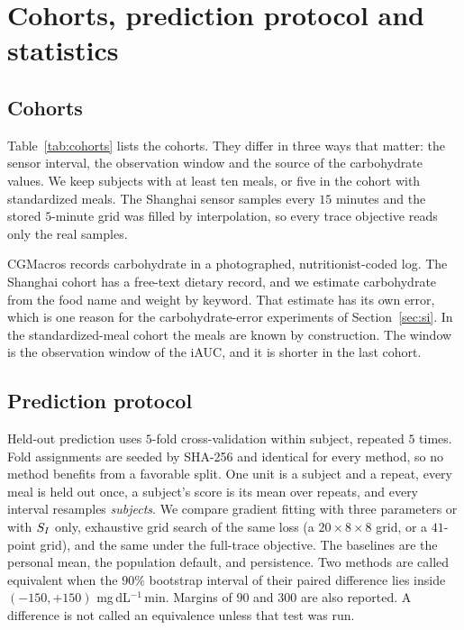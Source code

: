 \section{Cohorts, prediction protocol and statistics}
\label{app:setting}

\subsection{Cohorts}
\label{sec:cohorts}

Table~\ref{tab:cohorts} lists the cohorts. They differ in three ways that matter: the sensor interval, the observation
window and the source of the carbohydrate values. We keep subjects with at least ten meals, or five in the cohort with
standardized meals. The Shanghai sensor samples every $15$ minutes and the stored $5$-minute grid was filled by
interpolation, so every trace objective reads only the real samples.



CGMacros records carbohydrate in a photographed, nutritionist-coded log. The Shanghai cohort has a free-text dietary
record, and we estimate carbohydrate from the food name and weight by keyword. That estimate has its own error, which is
one reason for the carbohydrate-error experiments of Section~\ref{sec:si}. In the standardized-meal cohort the meals are
known by construction. The window is the observation window of the iAUC, and it is shorter in the last cohort.

\subsection{Prediction protocol}
\label{sec:cv}

Held-out prediction uses $5$-fold cross-validation within subject, repeated $5$ times. Fold assignments are seeded by
SHA-256 and identical for every method, so no method benefits from a favorable split. One unit is a subject and a
repeat, every meal is held out once, a subject's score is its mean over repeats, and every interval resamples
\emph{subjects}. We compare gradient fitting with three parameters or with $S_I$ only, exhaustive grid search of the same
loss (a $20\times8\times8$ grid, or a $41$-point grid), and the same under the full-trace objective. The baselines are
the personal mean, the population default, and persistence. Two methods are called equivalent when the $90\%$ bootstrap interval of their paired difference
lies inside $(-150,+150)$ mg\,dL$^{-1}$\,min. Margins of $90$ and $300$ are also reported. A difference is not called an
equivalence unless that test was run.

